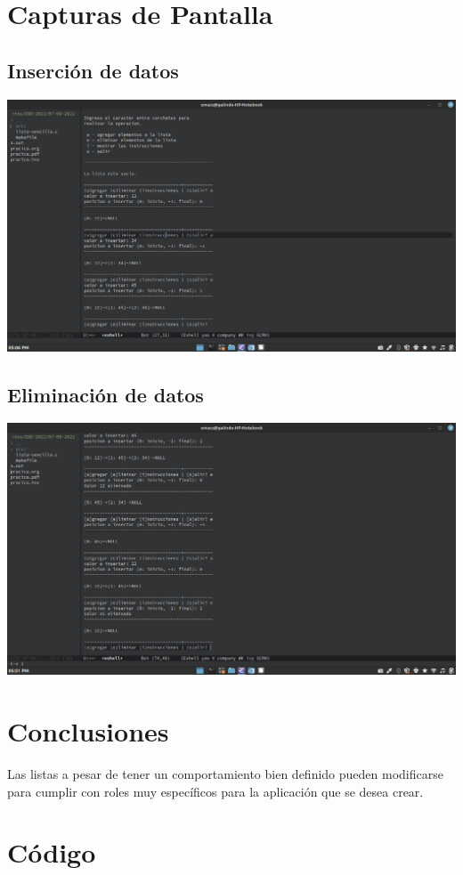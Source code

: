\documentclass[12pt]{article}
\begin{document}
\section*{Capturas de Pantalla}
\label{sec:orge5d756e}
\subsection*{Inserción de datos}
\label{sec:org5a34237}
\begin{center}
\includegraphics[width=.9\linewidth]{img/insertar.png}
\end{center}

\subsection*{Eliminación de datos}
\label{sec:orge86c278}
\begin{center}
\includegraphics[width=.9\linewidth]{img/eliminar.png}
\end{center}

\section*{Conclusiones}
\label{sec:orgb535ebf}
Las listas a pesar de tener un comportamiento bien definido pueden modificarse para cumplir con roles muy específicos para la aplicación que se desea crear. 

\section*{Código}
\label{sec:orgfc91fee}

\end{document}
